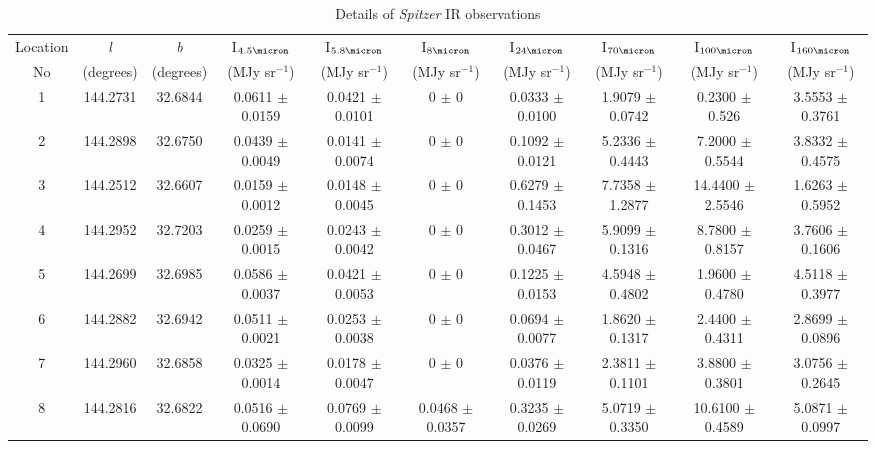 \begin{table*}
    \centering
    \caption{Details of \textit{Spitzer} IR observations}
    \begin{adjustbox}{width=\textwidth, center}
    \begin{tabular}{cccccccccc}
    \hline
Location & \textit{l} & \textit{b}  & I$_{4.5 \micron}$ & I$_{5.8 \micron}$ & I$_{8 \micron}$ & I$_{24 \micron}$ & I$_{70 \micron}$ & I$_{100 \micron}$ & I$_{160 \micron}$\\
  No      & (degrees) & (degrees)  & (MJy sr$^{-1}$) & (MJy sr$^{-1}$) & (MJy sr$^{-1}$) & (MJy sr$^{-1}$) & (MJy sr$^{-1}$) & (MJy sr$^{-1}$) & (MJy sr$^{-1}$) \\
       \hline
        1 & 144.2731 & 32.6844 & 0.0611 $\pm$ 0.0159 & 0.0421 $\pm$ 0.0101 & 0 $\pm$ 0 & 0.0333 $\pm$ 0.0100 & 1.9079 $\pm$ 0.0742 & 0.2300 $\pm$ 0.526 & 3.5553 $\pm$ 0.3761 \\
        2 & 144.2898 & 32.6750 & 0.0439 $\pm$ 0.0049 & 0.0141 $\pm$ 0.0074 & 0 $\pm$ 0 & 0.1092 $\pm$ 0.0121 & 5.2336 $\pm$ 0.4443 & 7.2000 $\pm$ 0.5544 & 3.8332 $\pm$ 0.4575 \\
        3 &144.2512 & 32.6607 & 0.0159 $\pm$ 0.0012 & 0.0148 $\pm$ 0.0045 & 0 $\pm$ 0 & 0.6279 $\pm$ 0.1453 & 7.7358 $\pm$ 1.2877 & 14.4400 $\pm$ 2.5546 & 1.6263 $\pm$ 0.5952 \\
        4 &144.2952 & 32.7203 & 0.0259 $\pm$ 0.0015 & 0.0243 $\pm$ 0.0042 & 0 $\pm$ 0 & 0.3012 $\pm$ 0.0467 & 5.9099 $\pm$ 0.1316 & 8.7800 $\pm$ 0.8157 & 3.7606 $\pm$ 0.1606 \\
        5 &144.2699 & 32.6985 & 0.0586 $\pm$ 0.0037 & 0.0421 $\pm$ 0.0053 & 0 $\pm$ 0 & 0.1225 $\pm$ 0.0153 & 4.5948 $\pm$ 0.4802 & 1.9600 $\pm$ 0.4780 & 4.5118 $\pm$ 0.3977 \\
        6 &144.2882 & 32.6942 & 0.0511 $\pm$ 0.0021 & 0.0253 $\pm$ 0.0038 & 0 $\pm$ 0 & 0.0694 $\pm$ 0.0077 & 1.8620 $\pm$ 0.1317 & 2.4400 $\pm$ 0.4311 & 2.8699 $\pm$ 0.0896 \\
        7 &144.2960 & 32.6858 & 0.0325 $\pm$ 0.0014 & 0.0178 $\pm$ 0.0047 & 0 $\pm$ 0 & 0.0376 $\pm$ 0.0119 & 2.3811 $\pm$ 0.1101 & 3.8800 $\pm$ 0.3801 & 3.0756 $\pm$ 0.2645 \\
        8 &144.2816 & 32.6822 & 0.0516 $\pm$ 0.0690 & 0.0769 $\pm$ 0.0099 & 0.0468 $\pm$ 0.0357 & 0.3235 $\pm$ 0.0269 & 5.0719 $\pm$ 0.3350 & 10.6100 $\pm$ 0.4589 & 5.0871 $\pm$ 0.0997 \\

\end{tabular}
\end{adjustbox}
\end{table*}
